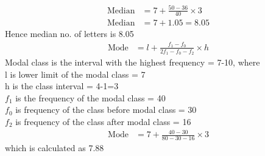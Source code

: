 \begin{enumerate}[label=\thesection.\arabic*.,ref=\thesection.\theenumi]
	\begin{align}
	\text{Median} &= 7 + \frac{50 - 36}{40}\times 3\\
	\text{Median} &= 7 + 1.05 = 8.05
	\end{align}
	Hence median no. of letters is 8.05
	\begin{align}
	\text{Mode} &= l + \frac{f_1 - f_0}{2f_1 - f_0 - f_2} \times h
	\end{align}
	Modal class is the interval with the highest frequency = 7-10, where\\
	l is lower limit of the modal class = 7\\
	h is the class interval = 4-1=3\\
	$f_1$ is the frequency of the modal class = 40\\
	$f_0$ is frequency of the class before modal class = 30\\
	$f_2$ is frequency of the class after modal class = 16\\
	\begin{align}
	\text{Mode} &= 7 + \frac{40-30}{80-30-16} \times 3
	\end{align}	
	which is calculated as 7.88
	
\end{enumerate}
